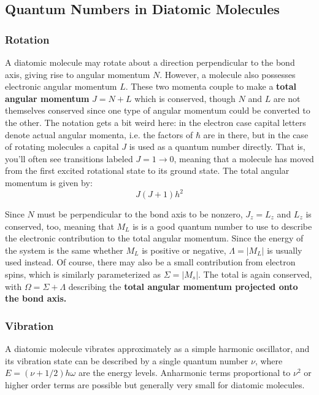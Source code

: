 \documentclass{article}
\newcommand{\be}{\begin{equation}}
\newcommand{\ee}{\end{equation}}
\begin{document}
\subsection{Quantum Numbers in Diatomic Molecules}

\subsubsection{Rotation}

A diatomic molecule may rotate about a direction perpendicular to the bond axis, giving rise to angular momentum $N$. However, a molecule also possesses electronic angular momentum $L$. These two momenta couple to make a \textbf{total angular momentum} $J = N + L$ which is conserved, though $N$ and $L$ are not themselves conserved since one type of angular momentum could be converted to the other. The notation gets a bit weird here: in the electron case capital letters denote actual angular momenta, i.e. the factors of $\hbar$ are in there, but in the case of rotating molecules a capital $J$ is used as a quantum number directly. That is, you'll often see transitions labeled $J = 1 \rightarrow 0$, meaning that a molecule has moved from the first excited rotational state to its ground state. The total angular momentum is given by: 
\be
J(J + 1)h^2
\ee

Since $N$ must be perpendicular to the bond axis to be nonzero, $J_z = L_z$ and $L_z$ is conserved, too, meaning that $M_L$ is is a good quantum number to use to describe the electronic contribution to the total angular momentum. Since the energy of the system is the same whether $M_L$ is positive or negative, $\Lambda = | M_L |$ is usually used instead. Of course, there may also be a small contribution from electron spins, which is similarly parameterized as $\Sigma = |M_s|$. The total is again conserved, with $\Omega = \Sigma + \Lambda$ describing the \textbf{total angular momentum projected onto the bond axis.}

\subsubsection{Vibration}

A diatomic molecule vibrates approximately as a simple harmonic oscillator, and its vibration state can be described by a single quantum number $\nu$, where $E = (\nu + 1 / 2)h\omega$ are the energy levels. Anharmonic terms proportional to $\nu^2$ or higher order terms are possible but generally very small for diatomic molecules.
\end{document}
